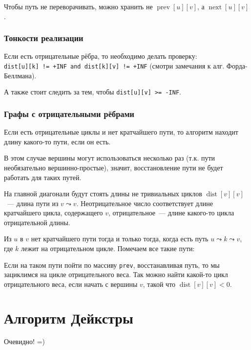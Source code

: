 \documentclass[a4paper,12pt]{article}
\DeclareMathOperator{\dist}{dist}
\DeclareMathOperator{\prev}{prev}
\DeclareMathOperator{\nextuv}{next}
\begin{document}
      Чтобы путь не переворачивать, можно хранить не $\prev[u][v]$, а $\nextuv[u][v]$.
      
      \subsubsection{Тонкости реализации}
      Если есть отрицательные рёбра, то необходимо делать проверку:\\
      \texttt{dist[u][k] != +INF and dist[k][v] != +INF}
      (смотри замечания к алг. Форда-Беллмана).
   
      А также стоит следить за тем, чтобы \texttt{dist[u][v] >= -INF}.

      \subsubsection{Графы с отрицательными рёбрами}
      Если есть отрицательные циклы и нет кратчайшего пути,
      то алгоритм находит длину какого-то пути, если он есть.
      
      В этом случае вершины могут использоваться несколько раз
      (т.к. пути необязательно вершинно-простые), значит,
      восстановление пути не будет работать для таких путей.
      
      На главной диагонали будут стоять длины не тривиальных циклов
      $\dist[v][v]$~--- длина пути из $v \leadsto v$. Неотрицательное число
      соответствует длине кратчайшего цикла, содержащего $v$,
      отрицательное~--- длине какого-то цикла отрицательной длины.
      
      Из $u$ в $v$ нет кратчайшего пути тогда и только тогда, когда есть путь
      $u \leadsto k \leadsto v$, где $k$ лежит на отрицательном цикле.
      Помечаем все такие пути:
      
      
      Если на таком пути пойти по массиву \texttt{prev}, восстанавливая путь,
      то мы зациклимся на цикле отрицательного веса. Так можно найти какой-то
      цикл отрицательного веса, если начать с вершины $v$,
      такой что ${\dist[v][v] < 0}$.

  \section{Алгоритм Дейкстры}
  Очевидно! =)
\end{document}
